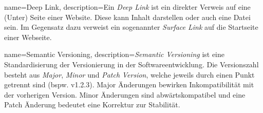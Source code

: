 {
	name={Deep Link},
	description={Ein \textit{Deep Link} ist ein direkter Verweis auf eine (Unter) Seite einer Website. Diese kann Inhalt darstellen oder auch eine Datei sein. Im Gegensatz dazu verweist ein sogenannter \textit{Surface Link} auf die Startseite einer Webseite.}
}

{
	name=Semantic Versioning,
	description={\textit{Semantic Versioning} ist eine Standardisierung der Versionierung in der Softwareentwicklung. Die Versionszahl besteht aus \textit{Major}, \textit{Minor} und \textit{Patch} \textit{Version}, welche jeweils durch einen Punkt getrennt sind (bspw. v1.2.3). Major Änderungen bewirken Inkompatibilität mit der vorherigen Version. Minor Änderungen sind abwärtskompatibel und eine Patch Änderung bedeutet eine Korrektur zur Stabilität.}
}